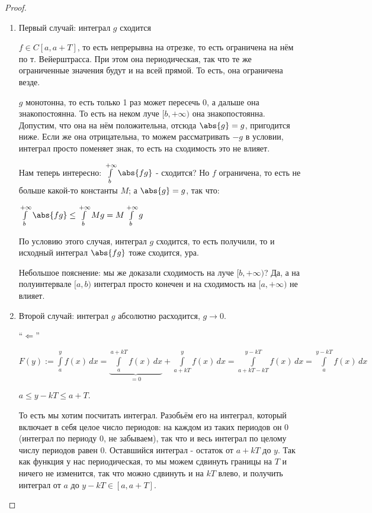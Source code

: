 \begin{proof}\slashns

    \begin{enumerate}
        \item Первый случай: интеграл $g$ сходится 

            $f \in C[a, a+T]$, то есть непрерывна на отрезке, то есть ограничена на нём по т. Вейерштрасса. При этом она периодическая, так что те же ограниченные значения будут и на всей прямой. То есть, она ограничена везде.

            $g$ монотонна, то есть только 1 раз может пересечь 0, а дальше она знакопостоянна. То есть на неком луче $[b, +\infty)$ она знакопостоянна. Допустим, что она на нём положительна, отсюда $\abs{g} = g$, пригодится ниже. Если же она отрицательна, то можем рассматривать $-g$ в условии, интеграл просто поменяет знак, то есть на сходимость это не влияет.

            Нам теперь интересно: $\int\limits_b^{+\infty} \abs{fg}$ - сходится? Но $f$ ограничена, то есть не больше какой-то константы $M$; а $\abs{g} = g$, так что:

            $\int\limits_b^{+\infty} \abs{fg} \le \int\limits_b^{+\infty} Mg = M\int\limits_b^{+\infty} g$

            По условию этого случая, интеграл $g$ сходится, то есть получили, то и исходный интеграл $\abs{fg}$ тоже сходится, ура.

            Небольшое пояснение: мы же доказали сходимость на луче $[b, +\infty)$? Да, а на полуинтервале $[a, b)$ интеграл просто конечен и на сходимость на $[a, +\infty)$ не влияет.

        \item Второй случай: интеграл $g$ абсолютно расходится, $g \to 0$. 

	``$\Longleftarrow$''
	
    $F(y) := \int\limits_a^y f(x) \, dx = \underbrace{\int\limits_{a}^{a+kT} f(x) \, dx}_{= 0} + \int\limits_{a+kT}^y f(x) \, dx = \int\limits_{a+kT-kT}^{y-kT} f(x) \, dx = \int\limits_{a}^{y-kT} f(x) \, dx$
	
	$a \le y - kT \le a+ T$.

    То есть мы хотим посчитать интеграл. Разобьём его на интеграл, который включает в себя целое число периодов: на каждом из таких периодов он 0 (интеграл по периоду 0, не забываем), так что и весь интеграл по целому числу периодов равен 0. Оставшийся интеграл - остаток от $a+kT$ до $y$. Так как функция у нас периодическая, то мы можем сдвинуть границы на $T$ и ничего не изменится, так что можно сдвинуть и на $kT$ влево, и получить интеграл от $a$ до $y-kT \in [a, a+T]$.  
	

\end{enumerate}
\end{proof}
